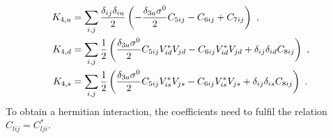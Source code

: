 \begin{align}
	K_{4,u} &= \sum_{i,j}\frac{\delta_{ij}\delta_{iu}}{2}\left(-\frac{\delta_{3a}\sigma^0}{2}C_{5ij} - C_{6ij} + C_{7ij}\right) \ , \notag \\
	K_{4,d} &= \sum_{i,j}\frac{1}{2}\left(\frac{\delta_{3a}\sigma^0}{2}C_{5ij}V_{id}^*V_{jd} - C_{6ij}V_{id}^*V_{jd} + \delta_{ij}\delta_{id}C_{8ij}\right) \ , \notag \\
	K_{4,s} &= \sum_{i,j}\frac{1}{2}\left(\frac{\delta_{3a}\sigma^0}{2}C_{5ij}V_{is}^*V_{js} - C_{6ij}V_{is}^*V_{js} + \delta_{ij}\delta_{is}C_{8ij}\right) \ .
\end{align}
To obtain a hermitian interaction, the coefficients need to fulfil the relation \mbox{$C_{lij} = C_{lji}^*$.}